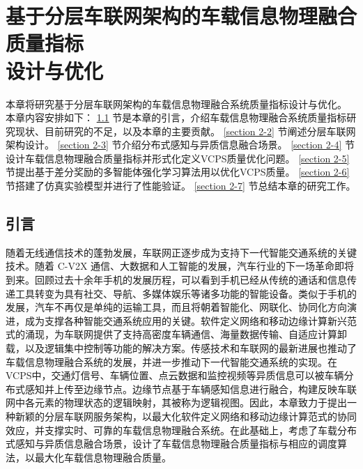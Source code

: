 \chapter[基于分层车联网架构的车载信息物理融合质量指标设计与优化]{基于分层车联网架构的车载信息物理融合质量指标\\设计与优化}
本章将研究基于分层车联网架构的车载信息物理融合系统质量指标设计与优化。
本章内容安排如下：
\ref{section 2-1} 节是本章的引言，介绍车载信息物理融合系统质量指标研究现状、目前研究的不足，以及本章的主要贡献。
\ref{section 2-2} 节阐述分层车联网架构设计。
\ref{section 2-3} 节介绍分布式感知与异质信息融合场景。
\ref{section 2-4} 节设计车载信息物理融合质量指标并形式化定义VCPS质量优化问题。
\ref{section 2-5} 节提出基于差分奖励的多智能体强化学习算法用以优化VCPS质量。
\ref{section 2-6} 节搭建了仿真实验模型并进行了性能验证。
\ref{section 2-7} 节总结本章的研究工作。

\section{引言}\label{section 2-1}

随着无线通信技术的蓬勃发展，车联网正逐步成为支持下一代智能交通系统的关键技术。随着 C-V2X 通信、大数据和人工智能的发展，汽车行业的下一场革命即将到来。回顾过去十余年手机的发展历程，可以看到手机已经从传统的通话和信息传递工具转变为具有社交、导航、多媒体娱乐等诸多功能的智能设备。类似于手机的发展，汽车不再仅是单纯的运输工具，而且将朝着智能化、网联化、协同化方向演进，成为支撑各种智能交通系统应用的关键。软件定义网络\cite{li2021zhi}和移动边缘计算\cite{liu2022fedcpf}新兴范式的涌现，为车联网提供了支持高密度车辆通信、海量数据传输、自适应计算卸载，以及逻辑集中控制等功能的解决方案。传感技术和车联网的最新进展也推动了车载信息物理融合系统的发展，并进一步推动下一代智能交通系统的实现。在VCPS中，交通灯信号、车辆位置、点云数据和监控视频等异质信息可以被车辆分布式感知并上传至边缘节点。边缘节点基于车辆感知信息进行融合，构建反映车联网中各元素的物理状态的逻辑映射，其被称为逻辑视图。因此，本章致力于提出一种新颖的分层车联网服务架构，以最大化软件定义网络和移动边缘计算范式的协同效应，并支撑实时、可靠的车载信息物理融合系统。在此基础上，考虑了车载分布式感知与异质信息融合场景，设计了车载信息物理融合质量指标与相应的调度算法，以最大化车载信息物理融合质量。

